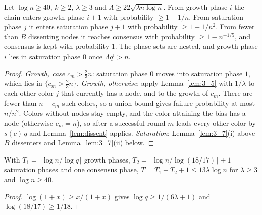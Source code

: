 \begin{lemma}\label{lem:phase_steps}
  \leanok
  Let $\log n \ge 40$, $k \ge 2$, $\lambda \ge 3$ and
  $\Lambda \ge 22\sqrt{\lambda n \log n}$.
  From growth phase $i$ the chain enters growth phase $i+1$ with probability
  $\ge 1 - 1/n$. From saturation phase $j$ it enters saturation phase $j+1$
  with probability $\ge 1 - 1/n^2$. From fewer than $B$ dissenting nodes it
  reaches consensus with probability $\ge 1 - n^{-1/5}$, and consensus is
  kept with probability $1$. The phase sets are nested, and growth phase $i$
  lies in saturation phase $0$ once $\Lambda q^i > n$.
\end{lemma}

\begin{proof}
  \emph{Growth, case $c_m > \frac23 n$}: saturation phase $0$ moves into
  saturation phase $1$, which lies in $\{c_m > \frac23 n\}$.
  \emph{Growth, otherwise}: apply Lemma~\ref{lem:3_5} with $1/\lambda$ to each
  other color $j$ that currently has a node, and to the growth of $c_m$. There
  are fewer than $n - c_m$ such colors, so a union bound gives failure
  probability at most $n/n^2$. Colors without nodes stay empty, and the color
  attaining the bias has a node (otherwise $c_m = n$), so after a successful
  round $m$ leads every other color by $s(c)\,q$ and
  Lemma~\ref{lem:dissent} applies.
  \emph{Saturation}: Lemma~\ref{lem:3_7}(i) above $B$ dissenters and
  Lemma~\ref{lem:3_7}(ii) below.
\end{proof}

\begin{lemma}\label{lem:phases}
  \leanok
  With $T_1 = \lceil \log n/\log q\rceil$ growth phases,
  $T_2 = \lceil \log n/\log(18/17)\rceil + 1$ saturation phases and one
  consensus phase, $T = T_1 + T_2 + 1 \le 13\lambda\log n$ for $\lambda \ge 3$
  and $\log n \ge 40$.
\end{lemma}

\begin{proof}
  $\log(1+x) \ge x/(1+x)$ gives $\log q \ge 1/(6\lambda+1)$ and
  $\log(18/17) \ge 1/18$.
\end{proof}

